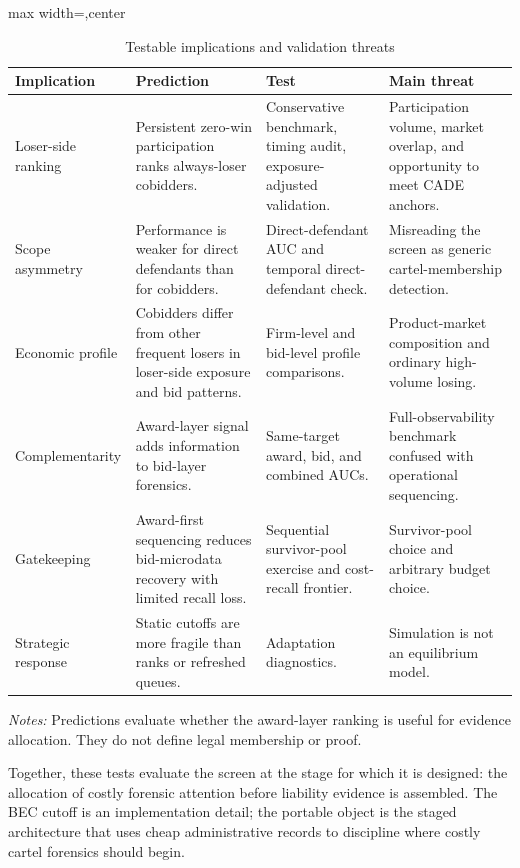 \begin{table}[htbp]
\centering
\caption{Testable implications and validation threats}
\label{tab:testable_implications_submission}
\footnotesize
\begin{adjustbox}{max width=\textwidth,center}
\begin{threeparttable}
\begin{tabular}{p{3.2cm}p{4.4cm}p{4.3cm}p{3.2cm}}
\toprule
Implication & Prediction & Test & Main threat \\
\midrule
Loser-side ranking & Persistent zero-win participation ranks always-loser cobidders. & Conservative benchmark, timing audit, exposure-adjusted validation. & Participation volume, market overlap, and opportunity to meet CADE anchors. \\
Scope asymmetry & Performance is weaker for direct defendants than for cobidders. & Direct-defendant AUC and temporal direct-defendant check. & Misreading the screen as generic cartel-membership detection. \\
Economic profile & Cobidders differ from other frequent losers in loser-side exposure and bid patterns. & Firm-level and bid-level profile comparisons. & Product-market composition and ordinary high-volume losing. \\
Complementarity & Award-layer signal adds information to bid-layer forensics. & Same-target award, bid, and combined AUCs. & Full-observability benchmark confused with operational sequencing. \\
Gatekeeping & Award-first sequencing reduces bid-microdata recovery with limited recall loss. & Sequential survivor-pool exercise and cost-recall frontier. & Survivor-pool choice and arbitrary budget choice. \\
Strategic response & Static cutoffs are more fragile than ranks or refreshed queues. & Adaptation diagnostics. & Simulation is not an equilibrium model. \\
\bottomrule
\end{tabular}
\begin{tablenotes}
\footnotesize
\item \textit{Notes:} Predictions evaluate whether the award-layer
ranking is useful for evidence allocation. They do not define
legal membership or proof.
\end{tablenotes}
\end{threeparttable}
\end{adjustbox}
\end{table}

Together, these tests evaluate the screen at the stage for which
it is designed: the allocation of costly forensic attention
before liability evidence is assembled. The BEC cutoff is an
implementation detail; the portable object is the staged
architecture that uses cheap administrative records to discipline
where costly cartel forensics should begin.
